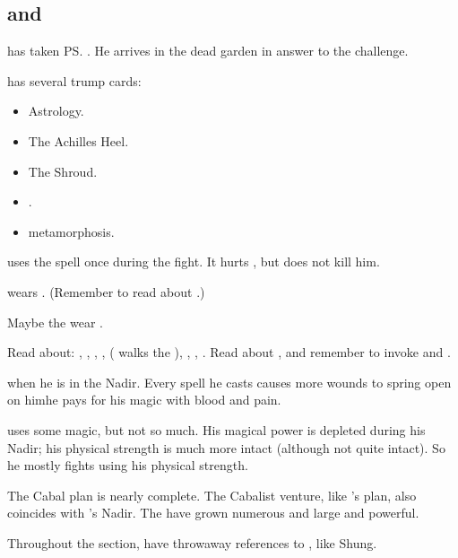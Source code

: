 \subsection{\Teshrial and \Ishnaruchaefir}
\Ishnaruchaefir{} has taken \ps{\Teshrial} . 
He arrives in the dead garden in answer to the challenge. 

\Teshrial{} has several trump cards:
\begin{itemize}
  \item Astrology. 
  \item The Achilles Heel. 
  \item The Shroud.
  \item \Noggyaleth.
  \item \NeoResphan metamorphosis. 
\end{itemize}
    
\Ishnaruchaefir{} uses the spell  once during the fight. 
It hurts \Teshrial, but does not kill him. 

\Ishnaruchaefir{} wears . 
(Remember to read about .)

Maybe the \resphain wear .

Read about: 
  ,
  ,
  ,
  ,
   (\Teshrial{} walks the ),
  ,
  ,
  . 
Read about , and remember to invoke \Sethicus and \Tiamat. 

\Ishnaruchaefir {} when he is in the Nadir. 
Every spell he casts causes more wounds to spring open on him\dash{}he pays for his magic with blood and pain.

\Ishnaruchaefir uses some magic, but not so much. 
His magical power is depleted during his Nadir; his physical strength is much more intact (although not quite intact). 
So he mostly fights using his physical strength. 

The Cabal plan is nearly complete. 
The Cabalist \Malcur venture, like \Secherdamon's plan, also coincides with \Ishnaruchaefir's Nadir. 
The \noggyaleth have grown numerous and large and powerful.

Throughout the section, have throwaway references to , like Shung. 




